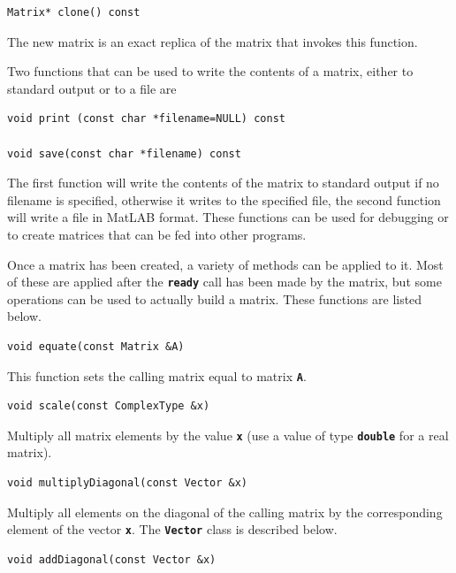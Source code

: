 \documentclass[12pt]{report} %
\begin{document}
{
\color{red}
\begin{Verbatim}[fontseries=b]
Matrix* clone() const
\end{Verbatim}
}

The new matrix is an exact replica of the matrix that invokes this function.

Two functions that can be used to write the contents of a matrix, either to standard output or to a file are

{
\color{red}
\begin{Verbatim}[fontseries=b]
void print (const char *filename=NULL) const

void save(const char *filename) const
\end{Verbatim}
}

The first function will write the contents of the matrix to standard output if no filename is specified, otherwise it writes to the specified file, the second function will write a file in MatLAB format. These functions can be used for debugging or to create matrices that can be fed into other programs.

Once a matrix has been created, a variety of methods can be applied to it. Most of these are applied after the \texttt{\textbf{ready}} call has been made by the matrix, but some operations can be used to actually build a matrix. These functions are listed below.

{
\color{red}
\begin{Verbatim}[fontseries=b]
void equate(const Matrix &A)
\end{Verbatim}
}

This function sets the calling matrix equal to matrix \texttt{\textbf{A}}.

{
\color{red}
\begin{Verbatim}[fontseries=b]
void scale(const ComplexType &x)
\end{Verbatim}
}

Multiply all matrix elements by the value \texttt{\textbf{x}} (use a value of type \texttt{\textbf{double}} for a real matrix).

{
\color{red}
\begin{Verbatim}[fontseries=b]
void multiplyDiagonal(const Vector &x)
\end{Verbatim}
}

Multiply all elements on the diagonal of the calling matrix by the corresponding element of the vector \texttt{\textbf{x}}. The \texttt{\textbf{Vector}} class is described below.

{
\color{red}
\begin{Verbatim}[fontseries=b]
void addDiagonal(const Vector &x)
\end{Verbatim}
}
\end{document}
